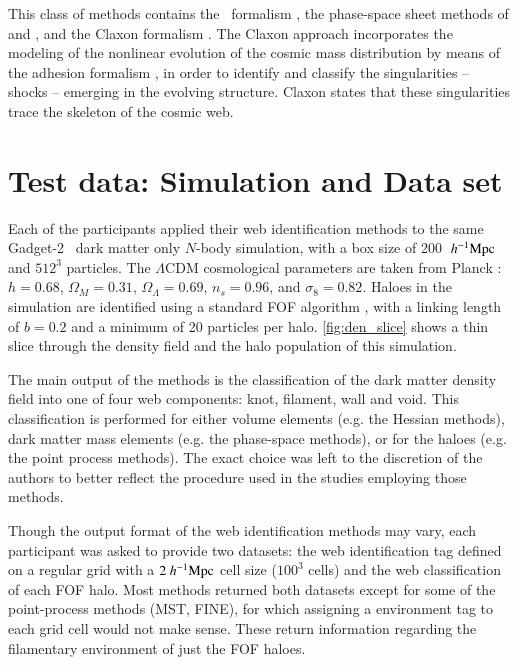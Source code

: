 \begin{itemize}
This class of methods contains the \origami\ formalism \citep{Falck2012,Falck2015}, the phase-space sheet methods of \cite{Shandarin2011} 
\citep[also see][]{Ramachandra2015} and \cite{Abel2012}, and the Claxon formalism \citep{Hidding2017}. The Claxon approach incorporates the modeling of 
the nonlinear evolution of the cosmic mass distribution by means of the adhesion 
formalism \citep{Gurbatov1989,Hidding2012}, in order to identify and classify the singularities -- shocks -- emerging 
in the evolving structure. Claxon states that these singularities trace the skeleton of the cosmic web. 
\end{itemize}
\section{Test data:  Simulation and Data set}
% 
\label{section:6simulation}

Each of the participants applied their web identification methods to the same Gadget-2~\citep{Springel2005c} dark matter only $N$-body simulation, with a box size of 200 $~h^{-1}\rm Mpc$ and $512^3$ particles. The $\Lambda$CDM cosmological parameters are taken from Planck \citep{2014A&A...571A..16P}: $h=0.68$, $\Omega_M = 0.31$, $\Omega_\Lambda = 0.69$, $n_s = 0.96$, and $\sigma_8 = 0.82$. Haloes in the simulation are identified using a standard FOF algorithm \citep{Davis1985}, with a linking length of $b=0.2$ and a minimum of 20 particles per halo. \autoref{fig:den_slice} shows a thin slice through the density field and the halo population of this simulation.

The main output of the methods is the classification of the dark matter density field into one of four web components: knot, filament, wall and void. This classification is performed for either volume elements (e.g. the Hessian methods), dark matter mass elements (e.g. the phase-space methods), or for the haloes (e.g. the point process methods). The exact choice was left to the discretion of the authors to better reflect the procedure used in the studies employing those methods. 

Though the output format of the web identification methods may vary, each participant was asked to provide two datasets: the web identification tag defined on a regular grid with a $2~h^{-1}\rm Mpc$ cell size ($100^3$ cells) and the web classification of each FOF halo. Most methods returned both datasets except for some of the point-process methods (MST, FINE), for which assigning a environment tag to each grid cell would not make sense. These return information regarding the filamentary environment of just the FOF haloes.

